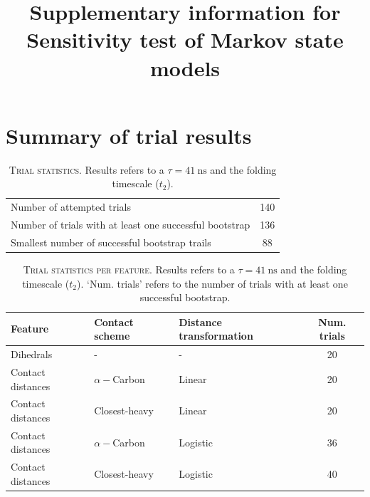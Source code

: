 \documentclass{article}
\title{Supplementary information for Sensitivity test of Markov state models}
\begin{document}
\maketitle

\section{Summary of trial results}

\begin{table}[h]
    \centering
    \begin{tabular}{|l|c|}
       Number of  attempted trials   & 140 \\
       Number of trials with at least one successful bootstrap & 136 \\
       Smallest number of successful bootstrap trails & 88
    \end{tabular}
    \caption{\textsc{Trial statistics}. Results refers to a $\tau=\SI{41}{\nano\second}$ and the folding timescale ($t_{2}$).}
    \label{tab:summary_stats_1}
\end{table}


\begin{table}[h]
    \centering
    \begin{tabular}{l|l|l|c}
        Feature & Contact scheme & Distance transformation & Num. trials  \\
        \toprule
        Dihedrals & - & - & 20 \\
        Contact distances & $\alpha-$Carbon & Linear & 20 \\
        Contact distances & Closest-heavy & Linear & 20 \\
        Contact distances & $\alpha-$Carbon & Logistic & 36 \\
        Contact distances & Closest-heavy & Logistic & 40 \\
    \end{tabular}
    \caption{\textsc{Trial statistics per feature}. Results refers to a $\tau=\SI{41}{\nano\second}$ and the folding timescale ($t_{2}$). `Num. trials' refers to the number of trials with at least one successful bootstrap.}
    \label{tab:summary_stats_2}
\end{table}
\end{document}
